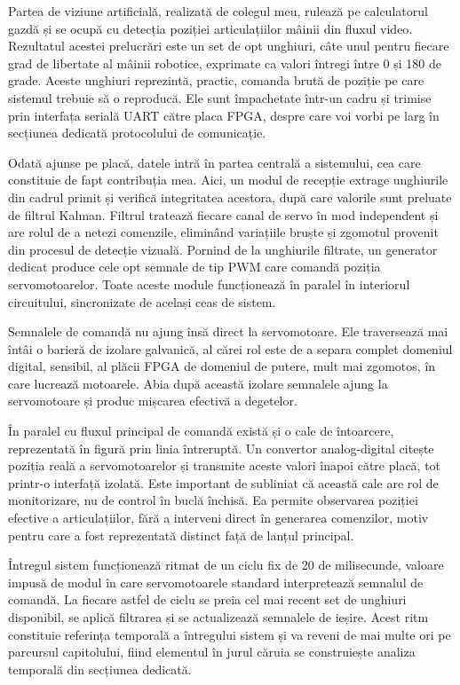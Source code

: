 Partea de viziune artificială, realizată de colegul meu, rulează pe calculatorul
gazdă și se ocupă cu detecția poziției articulațiilor mâinii din fluxul video.
Rezultatul acestei prelucrări este un set de opt unghiuri, câte unul pentru
fiecare grad de libertate al mâinii robotice, exprimate ca valori întregi între 0
și 180 de grade. Aceste unghiuri reprezintă, practic, comanda brută de poziție pe
care sistemul trebuie să o reproducă. Ele sunt împachetate într-un cadru și
trimise prin interfața serială UART către placa FPGA, despre care voi vorbi pe
larg în secțiunea dedicată protocolului de comunicație.

Odată ajunse pe placă, datele intră în partea centrală a sistemului, cea care
constituie de fapt contribuția mea. Aici, un modul de recepție extrage unghiurile
din cadrul primit și verifică integritatea acestora, după care valorile sunt
preluate de filtrul Kalman. Filtrul tratează fiecare canal de servo în mod
independent și are rolul de a netezi comenzile, eliminând variațiile bruște și
zgomotul provenit din procesul de detecție vizuală. Pornind de la unghiurile
filtrate, un generator dedicat produce cele opt semnale de tip PWM care comandă
poziția servomotoarelor. Toate aceste module funcționează în paralel în interiorul
circuitului, sincronizate de același ceas de sistem.

Semnalele de comandă nu ajung însă direct la servomotoare. Ele traversează mai
întâi o barieră de izolare galvanică, al cărei rol este de a separa complet
domeniul digital, sensibil, al plăcii FPGA de domeniul de putere, mult mai
zgomotos, în care lucrează motoarele. Abia după această izolare semnalele ajung la
servomotoare și produc mișcarea efectivă a degetelor.

În paralel cu fluxul principal de comandă există și o cale de întoarcere,
reprezentată în figură prin linia întreruptă. Un convertor analog-digital citește
poziția reală a servomotoarelor și transmite aceste valori înapoi către placă,
tot printr-o interfață izolată. Este important de subliniat că această cale are
rol de monitorizare, nu de control în buclă închisă. Ea permite observarea
poziției efective a articulațiilor, fără a interveni direct în generarea
comenzilor, motiv pentru care a fost reprezentată distinct față de lanțul
principal.

Întregul sistem funcționează ritmat de un ciclu fix de 20 de milisecunde, valoare
impusă de modul în care servomotoarele standard interpretează semnalul de comandă.
La fiecare astfel de ciclu se preia cel mai recent set de unghiuri disponibil, se
aplică filtrarea și se actualizează semnalele de ieșire. Acest ritm constituie
referința temporală a întregului sistem și va reveni de mai multe ori pe parcursul
capitolului, fiind elementul în jurul căruia se construiește analiza temporală din
secțiunea dedicată.

